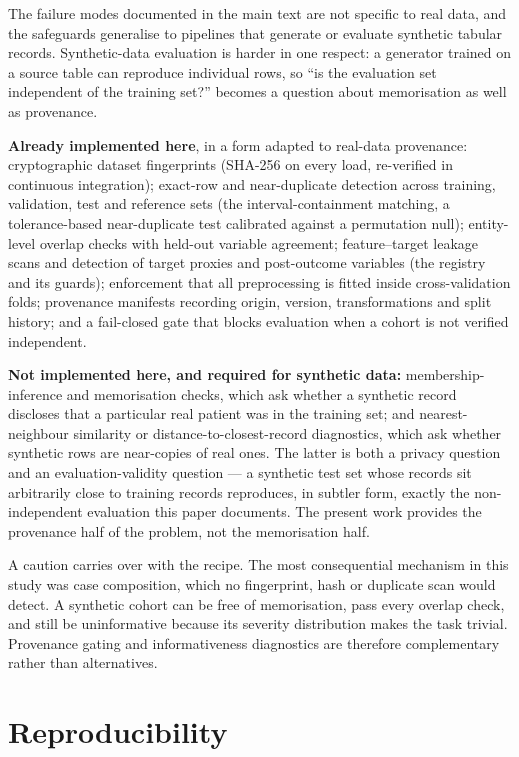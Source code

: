 \documentclass[conference]{IEEEtran}
\begin{document}
The failure modes documented in the main text are not specific to real data,
and the safeguards generalise to pipelines that generate or evaluate
synthetic tabular records. Synthetic-data evaluation is harder in one
respect: a generator trained on a source table can reproduce individual rows,
so ``is the evaluation set independent of the training set?'' becomes a
question about memorisation as well as provenance.

\textbf{Already implemented here}, in a form adapted to real-data provenance:
cryptographic dataset fingerprints (SHA-256 on every load, re-verified in
continuous integration); exact-row and near-duplicate detection across
training, validation, test and reference sets (the interval-containment
matching, a tolerance-based near-duplicate test calibrated against a
permutation null); entity-level overlap checks with held-out variable
agreement; feature--target leakage scans and detection of target proxies and
post-outcome variables (the registry and its guards); enforcement that all
preprocessing is fitted inside cross-validation folds; provenance manifests
recording origin, version, transformations and split history; and a
fail-closed gate that blocks evaluation when a cohort is not verified
independent.

\textbf{Not implemented here, and required for synthetic data:}
membership-inference and memorisation checks, which ask whether a synthetic
record discloses that a particular real patient was in the training set; and
nearest-neighbour similarity or distance-to-closest-record diagnostics, which
ask whether synthetic rows are near-copies of real ones. The latter is both a
privacy question and an evaluation-validity question --- a synthetic test set
whose records sit arbitrarily close to training records reproduces, in
subtler form, exactly the non-independent evaluation this paper documents.
The present work provides the provenance half of the problem, not the
memorisation half.

A caution carries over with the recipe. The most consequential mechanism in
this study was case composition, which no fingerprint, hash or duplicate scan
would detect. A synthetic cohort can be free of memorisation, pass every
overlap check, and still be uninformative because its severity distribution
makes the task trivial. Provenance gating and informativeness diagnostics are
therefore complementary rather than alternatives.

\section{Reproducibility}
\end{document}
